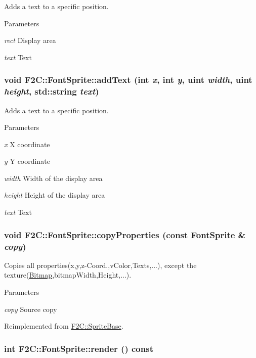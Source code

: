 Adds a text to a specific position. 
\begin{DoxyParams}{Parameters}
\item[{\em rect}]Display area \item[{\em text}]Text \end{DoxyParams}
\hypertarget{class_f2_c_1_1_font_sprite_ae1be1c6e70f794e6b8bf56b60528119e}{
\subsubsection[{addText}]{\setlength{\rightskip}{0pt plus 5cm}void F2C::FontSprite::addText (int {\em x}, \/  int {\em y}, \/  {\bf uint} {\em width}, \/  {\bf uint} {\em height}, \/  std::string {\em text})}}
\label{class_f2_c_1_1_font_sprite_ae1be1c6e70f794e6b8bf56b60528119e}


Adds a text to a specific position. 
\begin{DoxyParams}{Parameters}
\item[{\em x}]X coordinate \item[{\em y}]Y coordinate \item[{\em width}]Width of the display area \item[{\em height}]Height of the display area \item[{\em text}]Text \end{DoxyParams}
\hypertarget{class_f2_c_1_1_font_sprite_a36a224f59737fb06c4d79ee48b7e4068}{
\subsubsection[{copyProperties}]{\setlength{\rightskip}{0pt plus 5cm}void F2C::FontSprite::copyProperties (const {\bf FontSprite} \& {\em copy})}}
\label{class_f2_c_1_1_font_sprite_a36a224f59737fb06c4d79ee48b7e4068}


Copies all properties(x,y,z-\/Coord.,vColor,Texts,...), except the texture(\hyperlink{class_f2_c_1_1_bitmap}{Bitmap},bitmapWidth,Height,...). 
\begin{DoxyParams}{Parameters}
\item[{\em copy}]Source copy \end{DoxyParams}


Reimplemented from \hyperlink{class_f2_c_1_1_sprite_base_a8f7ea8a95a07688bfb2e6268a52b9215}{F2C::SpriteBase}.\hypertarget{class_f2_c_1_1_font_sprite_a2c6fc77162983dc4d750258144410272}{
\subsubsection[{render}]{\setlength{\rightskip}{0pt plus 5cm}int F2C::FontSprite::render () const}}
\label{class_f2_c_1_1_font_sprite_a2c6fc77162983dc4d750258144410272}


